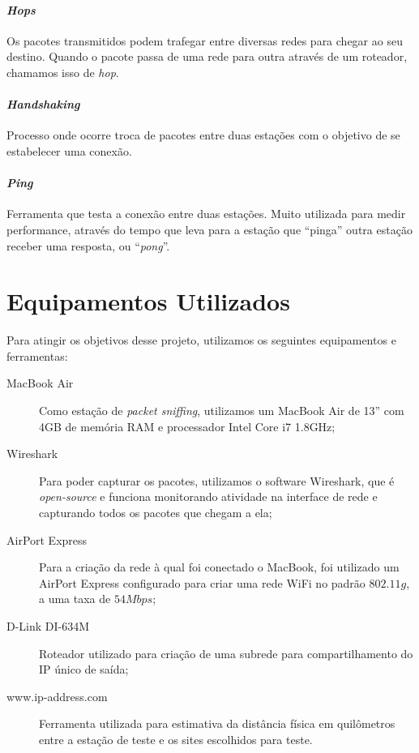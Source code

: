 \documentclass[12pt,a4paper]{report}
\begin{document}
\paragraph{\textit{Hops}} Os pacotes transmitidos podem trafegar entre diversas redes para chegar ao seu destino. Quando o pacote passa de uma rede para outra através de um roteador, chamamos isso de \textit{hop}.

\paragraph{\textit{Handshaking}} Processo onde ocorre troca de pacotes entre duas estações com o objetivo de se estabelecer uma conexão.

\paragraph{\textit{Ping}} Ferramenta que testa a conexão entre duas estações. Muito utilizada para medir performance, através do tempo que leva para a estação que ``pinga'' outra estação receber uma resposta, ou ``\textit{pong}''.

\section{Equipamentos Utilizados}

Para atingir os objetivos desse projeto, utilizamos os seguintes equipamentos e ferramentas:

\begin{description}
\item[MacBook Air] Como estação de \textit{packet sniffing}, utilizamos um MacBook Air de 13'' com 4GB de memória RAM e processador Intel Core i7 1.8GHz;
\item[Wireshark] Para poder capturar os pacotes, utilizamos o software Wireshark, que é \textit{open-source} e funciona monitorando atividade na interface de rede e capturando todos os pacotes que chegam a ela;
\item[AirPort Express] Para a criação da rede à qual foi conectado o MacBook, foi utilizado um AirPort Express configurado para criar uma rede WiFi no padrão \(802.11g\), a uma taxa de \(54Mbps\);
\item[D-Link DI-634M] Roteador utilizado para criação de uma subrede para compartilhamento do IP único de saída;
\item[www.ip-address.com] Ferramenta utilizada para estimativa da distância física em quilômetros entre a estação de teste e os sites escolhidos para teste.
\end{description}
\end{document}

